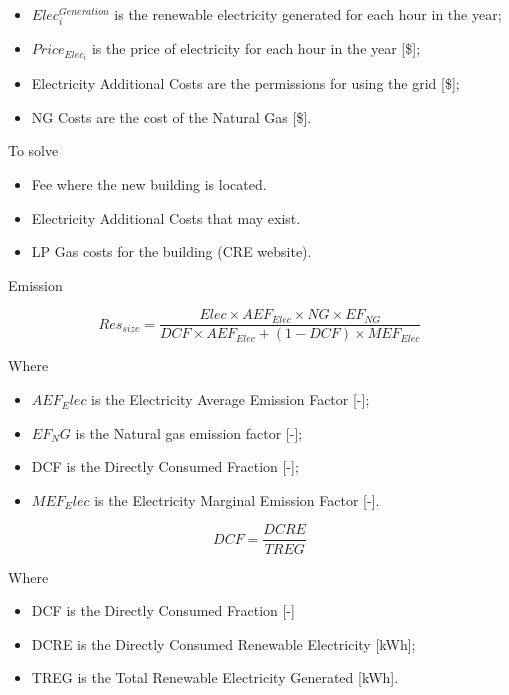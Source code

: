\begin{enumerate*}
\begin{itemize}
\begin{itemize}
\item $Elec_{i}^{Generation}$ is the renewable electricity generated for each hour in the year;

\item $Price_{Elec_{i}}$ is the price of electricity for each hour in the year [\$];

\item Electricity Additional Costs are the permissions for using the grid [\$];

\item NG Costs are the cost of the Natural Gas [\$].
\end{itemize}


To solve
\begin{itemize}
\item  Fee where the new building is located.
\item Electricity Additional Costs that may exist.
\item LP Gas costs for the building (CRE website).

\end{itemize}

Emission

\begin{equation}
Res_{size} =\frac{Elec \times AEF_{Elec} \times NG \times EF_{NG}}{DCF \times AEF_{Elec} + (1-DCF) \times MEF_{Elec}}
\end{equation}

Where
\begin{itemize}
\item $AEF_Elec$ is the Electricity Average Emission Factor [-]; 
\item $EF_NG$ is the Natural gas emission factor [-];
\item DCF is the Directly Consumed Fraction [-];
\item $MEF_Elec$ is the Electricity Marginal Emission Factor [-].

\end{itemize}

\begin{equation}
DCF = \frac{DCRE}{TREG}
\end{equation}

Where
\begin{itemize}
\item DCF is the Directly Consumed Fraction [-]
\item DCRE is the Directly Consumed Renewable Electricity [kWh]; 
\item TREG is the Total Renewable Electricity Generated [kWh].
\end{itemize}


\end{itemize}
\end{enumerate*}
